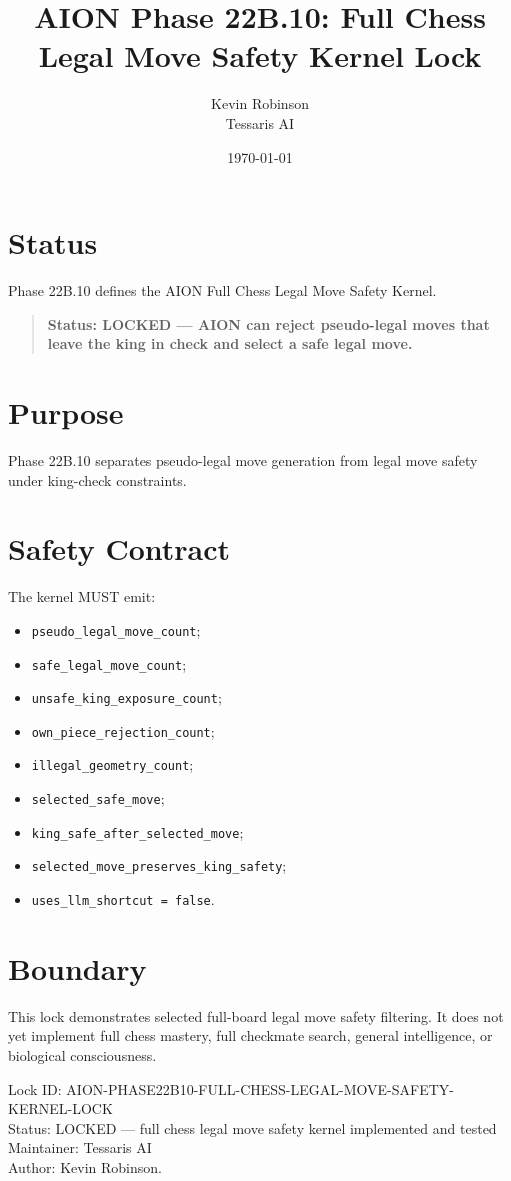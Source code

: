 \documentclass[11pt,a4paper]{article}
\title{\textbf{AION Phase 22B.10: Full Chess Legal Move Safety Kernel Lock}}
\author{Kevin Robinson\\Tessaris AI}
\date{\today}
\begin{document}
\maketitle

\section{Status}

Phase 22B.10 defines the AION Full Chess Legal Move Safety Kernel.

\begin{quote}
\textbf{Status: LOCKED --- AION can reject pseudo-legal moves that leave the king in check and select a safe legal move.}
\end{quote}

\section{Purpose}

Phase 22B.10 separates pseudo-legal move generation from legal move safety under king-check constraints.

\section{Safety Contract}

The kernel MUST emit:

\begin{itemize}
  \item \texttt{pseudo\_legal\_move\_count};
  \item \texttt{safe\_legal\_move\_count};
  \item \texttt{unsafe\_king\_exposure\_count};
  \item \texttt{own\_piece\_rejection\_count};
  \item \texttt{illegal\_geometry\_count};
  \item \texttt{selected\_safe\_move};
  \item \texttt{king\_safe\_after\_selected\_move};
  \item \texttt{selected\_move\_preserves\_king\_safety};
  \item \texttt{uses\_llm\_shortcut = false}.
\end{itemize}

\section{Boundary}

This lock demonstrates selected full-board legal move safety filtering. It does not yet implement full chess mastery, full checkmate search, general intelligence, or biological consciousness.

\bigskip

\noindent
Lock ID: AION-PHASE22B10-FULL-CHESS-LEGAL-MOVE-SAFETY-KERNEL-LOCK\\
Status: LOCKED --- full chess legal move safety kernel implemented and tested\\
Maintainer: Tessaris AI\\
Author: Kevin Robinson.
\end{document}
